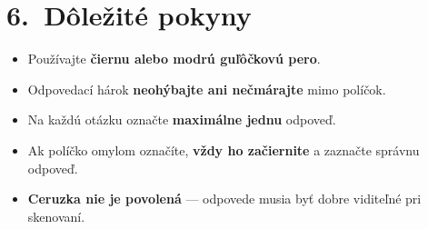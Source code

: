 \documentclass[10pt]{article}
\newcommand{\exEmptyBox}[2]{%
    \draw[gray, thick] (#1,#2) rectangle ++(0.45,0.45);
}
\newcommand{\exCrossBox}[2]{%
    \draw[gray, thick] (#1,#2) rectangle ++(0.45,0.45);
    \draw[thick] (#1+0.04,#2+0.04) -- (#1+0.41,#2+0.41);
    \draw[thick] (#1+0.04,#2+0.41) -- (#1+0.41,#2+0.04);
}
\newcommand{\exCircledFilledBox}[2]{%
    \draw[gray, thick] (#1,#2) rectangle ++(0.45,0.45);
    \fill[black!85] (#1,#2) rectangle (#1+0.45,#2+0.45);
    \draw[thick, white] (#1+0.225,#2+0.225) circle (0.18);
}
\begin{document}
\vspace{4pt}

\begin{center}
\end{center}

\vspace{2pt}

\section*{\small 6.\ Dôležité pokyny}
\vspace{-4pt}
\begin{itemize}[leftmargin=1.2cm, itemsep=1pt, topsep=2pt]
    \item[\small\textbullet] {\small Používajte \textbf{čiernu alebo modrú guľôčkovú pero}.}
    \item[\small\textbullet] {\small Odpovedací hárok \textbf{neohýbajte ani nečmárajte} mimo políčok.}
    \item[\small\textbullet] {\small Na každú otázku označte \textbf{maximálne jednu} odpoveď.}
    \item[\small\textbullet] {\small Ak políčko omylom označíte, \textbf{vždy ho začiernite} a zaznačte správnu odpoveď.}
    \item[\small\textbullet] {\small \textbf{Ceruzka nie je povolená} — odpovede musia byť dobre viditeľné pri skenovaní.}
\end{itemize}
\end{document}
